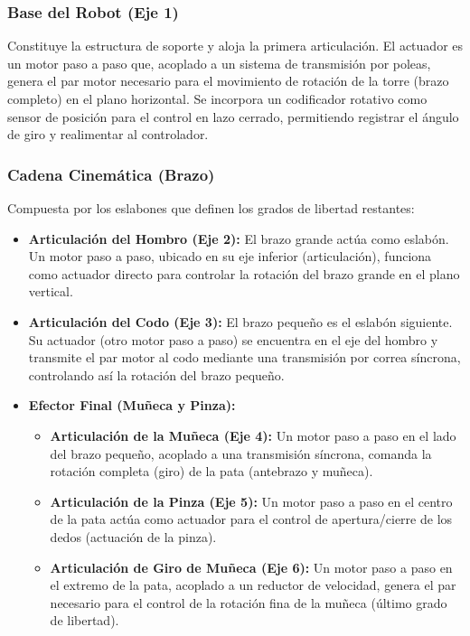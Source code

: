\documentclass[11pt]{article}
\begin{document}
\subsubsection{Base del Robot (Eje 1)}

Constituye la estructura de soporte y aloja la primera articulación. El actuador es un motor paso a paso que, acoplado a un sistema de transmisión por poleas, genera el par motor necesario para el movimiento de rotación de la torre (brazo completo) en el plano horizontal. Se incorpora un codificador rotativo como sensor de posición para el control en lazo cerrado, permitiendo registrar el ángulo de giro y realimentar al controlador.

\subsubsection{Cadena Cinemática (Brazo)}

Compuesta por los eslabones que definen los grados de libertad restantes:

\begin{itemize}
	\item \textbf{Articulación del Hombro (Eje 2):} El brazo grande actúa como eslabón. Un motor paso a paso, ubicado en su eje inferior (articulación), funciona como actuador directo para controlar la rotación del brazo grande en el plano vertical.
	
	\item \textbf{Articulación del Codo (Eje 3):} El brazo pequeño es el eslabón siguiente. Su actuador (otro motor paso a paso) se encuentra en el eje del hombro y transmite el par motor al codo mediante una transmisión por correa síncrona, controlando así la rotación del brazo pequeño.
	
	\item \textbf{Efector Final (Muñeca y Pinza):}
	\begin{itemize}
		\item \textbf{Articulación de la Muñeca (Eje 4):} Un motor paso a paso en el lado del brazo pequeño, acoplado a una transmisión síncrona, comanda la rotación completa (giro) de la pata (antebrazo y muñeca).
		\item \textbf{Articulación de la Pinza (Eje 5):} Un motor paso a paso en el centro de la pata actúa como actuador para el control de apertura/cierre de los dedos (actuación de la pinza).
		\item \textbf{Articulación de Giro de Muñeca (Eje 6):} Un motor paso a paso en el extremo de la pata, acoplado a un reductor de velocidad, genera el par necesario para el control de la rotación fina de la muñeca (último grado de libertad).
	\end{itemize}
\end{itemize}
\end{document}
